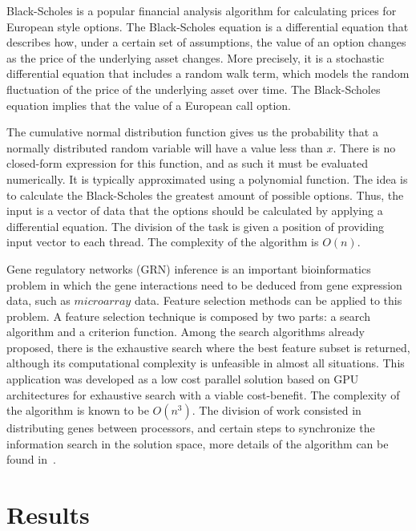 \documentclass[journal]{IEEEtran}
\begin{document}
Black-Scholes is a popular financial analysis algorithm for calculating prices
for European style options. The Black-Scholes equation is a differential
equation that describes how, under a certain set of assumptions, the value of an
option changes as the price of the underlying asset changes. More precisely, it
is a stochastic differential equation that includes a random walk term, which
models the random fluctuation of the price of the underlying asset over time.
The Black-Scholes equation implies that the value of a European call option.


The cumulative normal distribution function gives us the probability that a
normally distributed random variable will have a value less than $x$. There is no
closed-form expression for this function, and as such it must be evaluated
numerically. It is typically approximated using a polynomial function. The idea is to calculate the Black-Scholes the greatest amount of possible options. Thus, the input is a vector of data that the options should be calculated by applying a differential equation. The division of the task is given a position of providing input vector to each thread. The complexity of the algorithm is $O(n)$.


Gene regulatory networks (GRN) inference is an important bioinformatics problem in which the gene interactions need to be deduced from gene expression data, such as $microarray$ data. Feature selection methods can be applied to this problem. A feature selection technique is composed by two parts: a search algorithm and a criterion function. Among the search algorithms already proposed, there is the exhaustive search where the best
feature subset is returned, although its computational complexity is unfeasible in almost all situations. This application was developed as a low cost parallel solution based on GPU architectures for exhaustive search with a viable cost-benefit. The complexity of the algorithm is known to be $O(n^3)$. The division of work consisted in distributing genes between processors, and certain steps to synchronize the information search in the solution space, more details of the algorithm can be found in~\cite{borelli2013gene}.




\section{Results}
\end{document}
